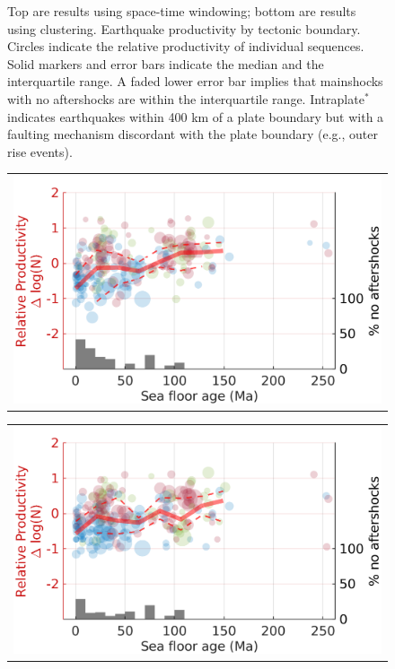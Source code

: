 \documentclass[draft]{agujournal}
\begin{document}
\begin{figure}[H]
    \caption{Top are results using space-time windowing; bottom are results using \citet{Zaliapin2008} clustering. Earthquake productivity by tectonic boundary. Circles indicate the relative productivity of individual sequences. Solid markers and error bars indicate the median and the interquartile range. A faded lower error bar implies that mainshocks with no aftershocks are within the interquartile range. Intraplate$^*$ indicates earthquakes within 400 km of a plate boundary but with a faulting mechanism discordant with the plate boundary (e.g., outer rise events).}
        \label{fig:plate_boundary_z2008}
\end{figure}

\newpage
\begin{figure}[H]
    \centering
    \begin{tabular}{@{}c@{}}
        \includegraphics{figures/prod_vs_age.png}
    \end{tabular}
    
    \begin{tabular}{@{}c@{}}
        \includegraphics{figures/prod_vs_age_z2008.png}
    \end{tabular}
    

\end{figure}
\end{document}
